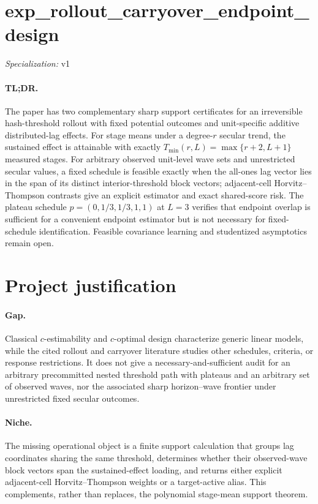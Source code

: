 \documentclass{article}
\begin{document}
\sloppy

\section*{exp\_\allowbreak{}rollout\_\allowbreak{}carryover\_\allowbreak{}endpoint\_\allowbreak{}design}

\noindent\textit{Specialization:} v1\par

\paragraph{TL;DR.} The paper has two complementary sharp support certificates for an irreversible hash-threshold rollout with fixed potential outcomes and unit-specific additive distributed-lag effects. For stage means under a degree-\(r\) secular trend, the sustained effect is attainable with exactly \(T_{\min}(r,L)=\max\{r+2,L+1\}\) measured stages. For arbitrary observed unit-level wave sets and unrestricted secular values, a fixed schedule is feasible exactly when the all-ones lag vector lies in the span of its distinct interior-threshold block vectors; adjacent-cell Horvitz--Thompson contrasts give an explicit estimator and exact shared-score risk. The plateau schedule \(p=(0,1/3,1/3,1,1)\) at \(L=3\) verifies that endpoint overlap is sufficient for a convenient endpoint estimator but is not necessary for fixed-schedule identification. Feasible covariance learning and studentized asymptotics remain open.

\section{Project justification}

\paragraph{Gap.} Classical \(c\)-estimability and \(c\)-optimal design characterize generic linear models, while the cited rollout and carryover literature studies other schedules, criteria, or response restrictions. It does not give a necessary-and-sufficient audit for an arbitrary precommitted nested threshold path with plateaus and an arbitrary set of observed waves, nor the associated sharp horizon--wave frontier under unrestricted fixed secular outcomes.

\paragraph{Niche.} The missing operational object is a finite support calculation that groups lag coordinates sharing the same threshold, determines whether their observed-wave block vectors span the sustained-effect loading, and returns either explicit adjacent-cell Horvitz--Thompson weights or a target-active alias. This complements, rather than replaces, the polynomial stage-mean support theorem.
\end{document}
